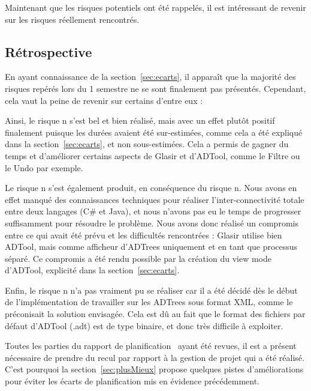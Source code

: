 Maintenant que les risques potentiels ont été rappelés, il est intéressant de revenir sur les risques réellement rencontrés.

\subsection{Rétrospective}
\label{ssec:risquesRetro}

En ayant connaissance de la {\sc section}~\ref{sec:ecarts}, il apparaît que la majorité des risques repérés lors du 1\ier{} semestre ne se sont finalement pas présentés. Cependant, cela vaut la peine de revenir sur certains d'entre eux :

Ainsi, le risque n s'est bel et bien réalisé, mais avec un effet plutôt positif finalement puisque les durées avaient été sur-estimées, comme cela a été expliqué dans la {\sc section}~\ref{sec:ecarts}, et non sous-estimées. Cela a permis de gagner du temps et d'améliorer certains aspects de Glasir et d'ADTool, comme le Filtre ou le Undo par exemple.

Le risque n s'est également produit, en conséquence du risque n. Nous avons en effet manqué des connaissances techniques pour réaliser l'inter-connectivité totale entre deux langages (C\# et Java), et nous n'avons pas eu le temps de progresser suffisamment pour résoudre le problème. Nous avons donc réalisé un compromis entre ce qui avait été prévu et les difficultés rencontrées : Glasir utilise bien ADTool, mais comme afficheur d'ADTrees uniquement et en tant que processus séparé. Ce compromis a été rendu possible par la création du \og view mode \fg{} d'ADTool, explicité dans la {\sc section}~\ref{sec:ecarts}.

Enfin, le risque n n'a pas vraiment pu se réaliser car il a été décidé dès le début de l'implémentation de travailler sur les ADTrees sous format XML, comme le préconisait la solution envisagée. Cela est dû au fait que le format des fichiers par défaut d'ADTool (.adt) est de type binaire, et donc très difficile à exploiter.

Toutes les parties du rapport de planification~\cite{planif} ayant été revues, il est a présent nécessaire de prendre du recul par rapport à la gestion de projet qui a été réalisé. C'est pourquoi la {\sc section}~\ref{sec:plusMieux} propose quelques pistes d'améliorations pour éviter les écarts de planification mis en évidence précédemment.
